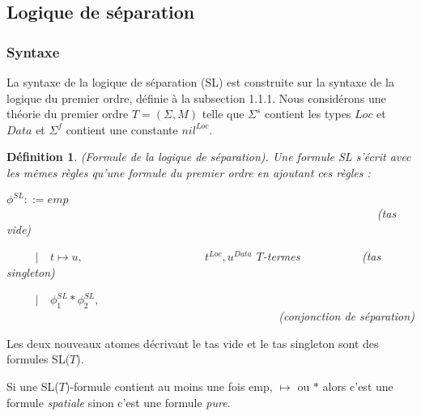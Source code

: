 \documentclass[11pt,openany]{article}
\newtheorem{definition}{D\'efinition}[subsection]
\begin{document}
	\subsection{Logique de s\'eparation}
		\subsubsection{Syntaxe}
	La syntaxe de la logique de s\'eparation (SL)\cite{OHearnRY01} est construite sur la syntaxe de la logique du premier ordre, d\'efinie \`a la subsection 1.1.1. Nous consid\'erons une th\'eorie du premier ordre $T=(\Sigma,M)$ telle que $\Sigma^{s}$ contient les types $Loc$ et $Data$ et $\Sigma^{f}$ contient une constante $nil^{Loc}$.
	\begin{definition}
	(Formule de la logique de s\'eparation). Une formule SL s'\'ecrit avec les m\^emes r\`egles qu'une formule du premier ordre en ajoutant ces r\`egles :
	
	$\phi^{SL} ::=  emp$~~~~~~~~~~~~~~~~~~~~~~~~~~~~~~~~~~~~~~~~~~~~~~~~~~~~~~~~~~~~~~~~(tas vide)
	
~~~~~$|$~~$t\mapsto u,$~~~~~~~~~~~~~~~~~~~~~$t^{Loc},u^{Data}$ $T$-termes ~~~~~~~~~~(tas singleton)


~~~~~$|$~~$\phi_{1}^{SL} * \phi_{2}^{SL},$~~~~~~~~~~~~~~~~~~~~~~~~~~~~~~~~~~~~~~~~~~~~~~~(conjonction de s\'eparation)

	\end{definition}
	
	Les deux nouveaux atomes d\'ecrivant le tas vide et le tas singleton sont des formules SL($T$).
	
	Si une SL($T$)-formule contient au moins une fois emp, $\mapsto$ ou $*$ alors c'est une formule \textit{spatiale} sinon c'est une formule \textit{pure}.
	
\end{document}
